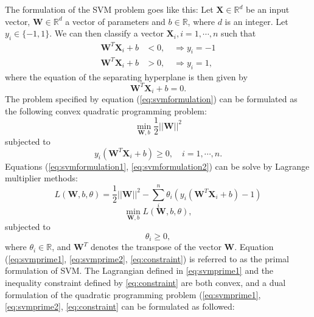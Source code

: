 \documentclass[../Main/thesis.tex]{subfiles}
\begin{document}
\justify
The formulation of the SVM problem goes like this: Let $\bm{X} \in \mathbb{R}^{d}$  be an input vector, $\bm{W}\in \mathbb{R}^{d}$ a vector of parameters and $b\in \mathbb{R}$, where $d$ is an integer. Let $y_{i}\in \{-1,1\}$. We can then classify a vector $\bm{X}_{i}, i = 1,\cdots,n$ such that
\begin{equation}\label{eq:svmformulation}
\begin{split}
\bm{W}^{T}\bm{X}_{i} + b &< 0, \quad \Rightarrow y_{i} = -1\\
\bm{W}^{T}\bm{X}_{i} + b &> 0, \quad \Rightarrow y_{i} = 1,
\end{split}
\end{equation}
where the equation of the separating hyperplane is then given by 
\begin{equation}
\bm{W}^{T}\bm{X}_{i} + b = 0.
\end{equation}
The problem specified by equation (\ref{eq:svmformulation}) can be formulated as the following convex quadratic programming problem:
\begin{equation}\label{eq:svmformulation1}
\min_{\bm{W},b}\frac{1}{2}||  \bm{W}||^{2}
\end{equation}
subjected to 
\begin{equation}\label{eq:svmformulation2}
y_{i}\left( \bm{W}^{T}\bm{X}_{i} + b \right) \geq 0, \quad i = 1,\cdots,n.
\end{equation}
Equations (\ref{eq:svmformulation1}, \ref{eq:svmformulation2}) can be solve by Lagrange multiplier methods:
\begin{equation}\label{eq:svmprime1}
L(\bm{W}, b, \theta) = \frac{1}{2}||  \bm{W}||^{2} -\sum_{i}^{n}\theta_{i}\left(y_{i}\left( \bm{W}^{T}\bm{X}_{i} + b \right) -1  \right)
\end{equation}
\begin{equation}\label{eq:svmprime2}
\min_{\bm{W},b}L(\bm{W}, b, \theta),
\end{equation}
subjected to 
\begin{equation}\label{eq:constraint}
\theta_{i} \geq 0,
\end{equation}
 where $\theta_{i} \in \mathbb{R}$, and $\bm{W}^{T}$ denotes the transpose of the vector $\bm{W}$. Equation (\ref{eq:svmprime1}, \ref{eq:svmprime2}, \ref{eq:constraint}) is referred to as the primal formulation of SVM. The Lagrangian defined in \ref{eq:svmprime1} and the inequality constraint defined by \ref{eq:constraint} are both convex, and a dual formulation of the quadratic programming problem (\ref{eq:svmprime1}, \ref{eq:svmprime2}, \ref{eq:constraint} can be formulated as followed:
\end{document}
